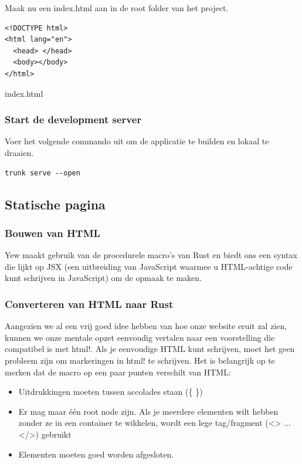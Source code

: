 Maak nu een index.html aan in de root folder van het project.

\begin{listing}[h]
\begin{verbatim}
<!DOCTYPE html>
<html lang="en">
  <head> </head>
  <body></body>
</html>
\end{verbatim}
\caption{index.html}
\end{listing}

\subsubsection{Start de development server}

Voer het volgende commando uit om de applicatie te builden en lokaal te draaien.

\begin{verbatim}
trunk serve --open
\end{verbatim}

\subsection{Statische pagina}

\subsubsection{Bouwen van HTML}

Yew maakt gebruik van de procedurele macro's van Rust en biedt ons een syntax die lijkt op JSX (een
uitbreiding van JavaScript waarmee u HTML-achtige code kunt schrijven in JavaScript) om de opmaak te
maken.

\clearpage

\subsubsection{Converteren van HTML naar Rust}

Aangezien we al een vrij goed idee hebben van hoe onze website eruit zal zien, kunnen we onze
mentale opzet eenvoudig vertalen naar een voorstelling die compatibel is met html!. Als je
eenvoudige HTML kunt schrijven, moet het geen probleem zijn om markeringen in html! te schrijven.
Het is belangrijk op te merken dat de macro op een paar punten verschilt van HTML:
\begin{itemize}
  \item Uitdrukkingen moeten tussen accolades staan (\{ \})
  \item Er mag maar één root node zijn. Als je
    meerdere elementen wilt hebben zonder ze in een container te wikkelen, wordt een lege
    tag/fragment (<> ... </>) gebruikt
  \item Elementen moeten goed worden afgesloten.
\end{itemize}

